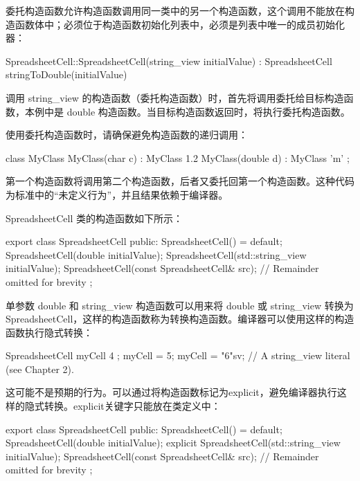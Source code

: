 
委托构造函数允许构造函数调用同一类中的另一个构造函数，这个调用不能放在构造函数体中；必须位于构造函数初始化列表中，必须是列表中唯一的成员初始化器：

\begin{cpp}
SpreadsheetCell::SpreadsheetCell(string_view initialValue)
: SpreadsheetCell { stringToDouble(initialValue) }
{}
\end{cpp}

调用 string\_view 的构造函数（委托构造函数）时，首先将调用委托给目标构造函数，本例中是 double 构造函数。当目标构造函数返回时，将执行委托构造函数。

使用委托构造函数时，请确保避免构造函数的递归调用：

\begin{cpp}
class MyClass
{
    MyClass(char c) : MyClass { 1.2 } { }
    MyClass(double d) : MyClass { 'm' } { }
};
\end{cpp}

第一个构造函数将调用第二个构造函数，后者又委托回第一个构造函数。这种代码为标准中的“未定义行为”，并且结果依赖于编译器。


SpreadsheetCell 类的构造函数如下所示：

\begin{cpp}
export class SpreadsheetCell
{
    public:
        SpreadsheetCell() = default;
        SpreadsheetCell(double initialValue);
        SpreadsheetCell(std::string_view initialValue);
        SpreadsheetCell(const SpreadsheetCell& src);
    // Remainder omitted for brevity
};
\end{cpp}

单参数 double 和 string\_view 构造函数可以用来将 double 或 string\_view 转换为 SpreadsheetCell，这样的构造函数称为转换构造函数。编译器可以使用这样的构造函数执行隐式转换：

\begin{cpp}
SpreadsheetCell myCell { 4 };
myCell = 5;
myCell = "6"sv; // A string_view literal (see Chapter 2).
\end{cpp}

这可能不是预期的行为。可以通过将构造函数标记为explicit，避免编译器执行这样的隐式转换。explicit关键字只能放在类定义中：

\begin{cpp}
export class SpreadsheetCell
{
    public:
        SpreadsheetCell() = default;
        SpreadsheetCell(double initialValue);
        explicit SpreadsheetCell(std::string_view initialValue);
        SpreadsheetCell(const SpreadsheetCell& src);
    // Remainder omitted for brevity
};
\end{cpp}

